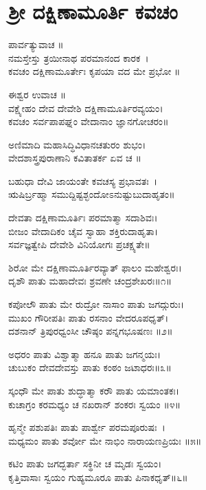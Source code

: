 \section{ಶ್ರೀ ದಕ್ಷಿಣಾಮೂರ್ತಿ ಕವಚಂ}
ಪಾರ್ವತ್ಯುವಾಚ ॥\\
ನಮಸ್ತೇಸ್ತು ತ್ರಯೀನಾಥ ಪರಮಾನಂದ ಕಾರಕ~।\\
ಕವಚಂ ದಕ್ಷಿಣಾಮೂರ್ತೇಃ ಕೃಪಯಾ ವದ ಮೇ ಪ್ರಭೋ ॥

ಈಶ್ವರ ಉವಾಚ ॥\\
ವಕ್ಷ್ಯೇಹಂ ದೇವ ದೇವೇಶಿ ದಕ್ಷಿಣಾಮೂರ್ತಿರವ್ಯಯಂ।\\
ಕವಚಂ ಸರ್ವಪಾಪಘ್ನಂ ವೇದಾನಾಂ ಜ್ಞಾನಗೋಚರಂ॥

ಅಣಿಮಾದಿ ಮಹಾಸಿದ್ಧಿವಿಧಾನಚತುರಂ ಶುಭಂ।\\
ವೇದಶಾಸ್ತ್ರಪುರಾಣಾನಿ ಕವಿತಾತರ್ಕ ಏವ ಚ ॥

ಬಹುಧಾ ದೇವಿ ಜಾಯಂತೇ ಕವಚಸ್ಯ ಪ್ರಭಾವತಃ~।\\
ಋಷಿರ್ಬ್ರಹ್ಮಾ ಸಮುದ್ದಿಷ್ಟಶ್ಛಂದೋಽನುಷ್ಟುಬುದಾಹೃತಂ॥

ದೇವತಾ ದಕ್ಷಿಣಾಮೂರ್ತಿಃ ಪರಮಾತ್ಮಾ ಸದಾಶಿವಃ।\\
ಬೀಜಂ ವೇದಾದಿಕಂ ಚೈವ ಸ್ವಾಹಾ ಶಕ್ತಿರುದಾಹೃತಾ।\\
ಸರ್ವಜ್ಞತ್ವೇಪಿ ದೇವೇಶಿ ವಿನಿಯೋಗಃ ಪ್ರಚಕ್ಷ್ಯತೇ॥


ಶಿರೋ ಮೇ ದಕ್ಷಿಣಾಮೂರ್ತಿರವ್ಯಾತ್ ಫಾಲಂ ಮಹೇಶ್ವರಃ।\\
ದೃಶೌ ಪಾತು ಮಹಾದೇವಃ ಶ್ರವಣೇ ಚಂದ್ರಶೇಖರಃ॥೧॥

ಕಪೋಲೌ ಪಾತು ಮೇ ರುದ್ರೋ ನಾಸಾಂ ಪಾತು ಜಗದ್ಗುರುಃ।\\
ಮುಖಂ ಗೌರೀಪತಿಃ ಪಾತು ರಸನಾಂ ವೇದರೂಪಧೃತ್।\\
ದಶನಾನ್ ತ್ರಿಪುರಧ್ವಂಸೀ ಚೌಷ್ಠಂ ಪನ್ನಗಭೂಷಣಃ ॥೨॥

ಅಧರಂ ಪಾತು ವಿಶ್ವಾತ್ಮಾ ಹನೂ ಪಾತು ಜಗನ್ಮಯಃ।\\
ಚುಬುಕಂ ದೇವದೇವಸ್ತು ಪಾತು ಕಂಠಂ ಜಟಾಧರಃ॥೩॥

ಸ್ಕಂಧೌ ಮೇ ಪಾತು ಶುದ್ಧಾತ್ಮಾ ಕರೌ ಪಾತು ಯಮಾಂತಕಃ।\\
ಕುಚಾಗ್ರಂ ಕರಮಧ್ಯಂ ಚ ನಖರಾನ್ ಶಂಕರಃ ಸ್ವಯಂ ॥೪॥

ಹೃನ್ಮೇ ಪಶುಪತಿಃ ಪಾತು ಪಾರ್ಶ್ವೇ ಪರಮಪೂರುಷಃ~।\\
ಮಧ್ಯಮಂ ಪಾತು ಶರ್ವೋ ಮೇ ನಾಭಿಂ ನಾರಾಯಣಪ್ರಿಯಃ ॥೫॥

ಕಟಿಂ ಪಾತು ಜಗದ್ಭರ್ತಾ ಸಕ್ಥಿನೀ ಚ ಮೃಡಃ ಸ್ವಯಂ।\\
ಕೃತ್ತಿವಾಸಾಃ ಸ್ವಯಂ ಗುಹ್ಯಮೂರೂ ಪಾತು ಪಿನಾಕಧೃತ್॥೬॥

